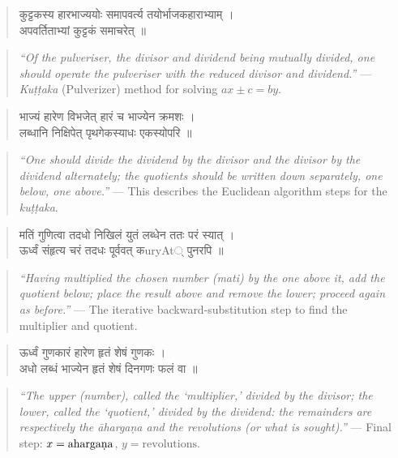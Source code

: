 \documentclass[11pt,a4paper]{article}
\newcommand{\dev}[1]{{\devanagarifont #1}}
\theoremstyle{definition}
\begin{document}
\noindent
\begin{quote}
\dev{कुट्टकस्य हारभाज्ययोः समापवर्त्य तयोर्भाजकहाराभ्याम् ।\\
अपवर्तिताभ्यां कुट्टकं समाचरेत् ॥}
\end{quote}

\hfill\noindent
\begin{quote}
\textit{``Of the pulveriser, the divisor and dividend being mutually divided, one should operate the pulveriser with the reduced divisor and dividend.''} --- \textit{Ku\d{t}\d{t}aka} (Pulverizer) method for solving $ax \pm c = by$.
\end{quote}

\noindent
\begin{quote}
\dev{भाज्यं हारेण विभजेत् हारं च भाज्येन क्रमशः ।\\
लब्धानि निक्षिपेत् पृथगेकस्याधः एकस्योपरि ॥}
\end{quote}

\hfill\noindent
\begin{quote}
\textit{``One should divide the dividend by the divisor and the divisor by the dividend alternately; the quotients should be written down separately, one below, one above.''} --- This describes the Euclidean algorithm steps for the \textit{ku\d{t}\d{t}aka}.
\end{quote}

\noindent
\begin{quote}
\dev{मतिं गुणित्वा तदधो निखिलं युतं लब्धेन ततः परं स्यात् ।\\
ऊर्ध्वं संहृत्य चरं तदधः पूर्ववत् कuryAt् पुनरपि ॥}
\end{quote}

\hfill\noindent
\begin{quote}
\textit{``Having multiplied the chosen number (mati) by the one above it, add the quotient below; place the result above and remove the lower; proceed again as before.''} --- The iterative backward-substitution step to find the multiplier and quotient.
\end{quote}

\noindent
\begin{quote}
\dev{ऊर्ध्वं गुणकारं हारेण हृतं शेषं गुणकः ।\\
अधो लब्धं भाज्येन हृतं शेषं दिनगणः फलं वा ॥}
\end{quote}

\hfill\noindent
\begin{quote}
\textit{``The upper (number), called the `multiplier,' divided by the divisor; the lower, called the `quotient,' divided by the dividend: the remainders are respectively the \=aharga\d{n}a and the revolutions (or what is sought).''} --- Final step: $x = \text{aharga\d{n}a}$, $y = \text{revolutions}$.
\end{quote}
\end{document}
